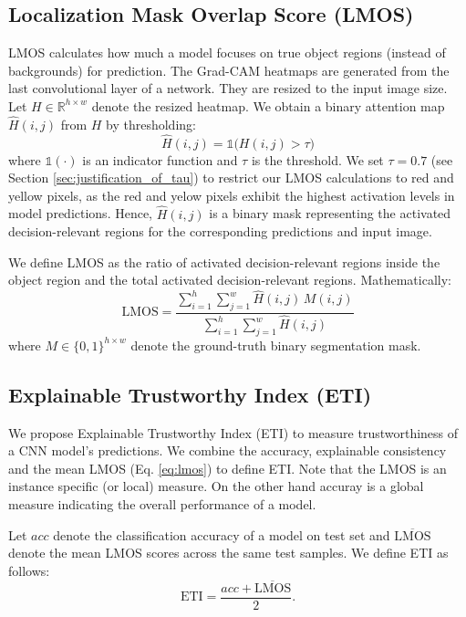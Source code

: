 \documentclass[a4paper,fleqn]{cas-dc}
\begin{document}
	\subsection{Localization Mask Overlap Score (LMOS)} 
	\label{sec:lmos}
	LMOS calculates how much a model focuses on true object regions (instead of backgrounds) for prediction. The Grad-CAM heatmaps are generated from
    the last convolutional layer of a network. They are resized to the input image size. 
	Let $H \in \mathbb{R}^{h \times w}$ denote the resized heatmap. 
	We obtain a binary attention map $\hat H (i,j)$ from $H$ by thresholding:
	\begin{equation}
		\label{eq:binary_attention_map}
		\hat H (i,j) = \mathds{1}\bigl( H(i,j) > \tau \bigr)
	\end{equation}
	where $ \mathds{1}(\cdot)$ is an indicator function and $\tau$ is the threshold. 
	We set $\tau=0.7$ (see Section \ref{sec:justification_of_tau}) to restrict our LMOS calculations to red and yellow pixels, as the red and yelow pixels exhibit the highest activation levels in model predictions. 
	Hence, $\hat{H}(i,j)$ is a binary mask representing the activated decision-relevant regions for the corresponding predictions and input image. 
	
	We define LMOS as the ratio of activated decision-relevant regions inside the object region and the total activated decision-relevant regions. 
	Mathematically:
	\begin{equation}
		\label{eq:lmos}
		\mathrm{LMOS}  = \frac{\sum_{i=1}^{h}\sum_{j=1}^{w} \hat{H}(i,j)\, M(i,j)} {\sum_{i=1}^{h}\sum_{j=1}^{w} \hat{H}(i,j)}
	\end{equation}
	where $M \in \{0,1\}^{h \times w}$ denote the ground-truth binary segmentation mask.  
	
	\subsection{Explainable Trustworthy Index (ETI)}
	\label{sec:implementaiton_TI}
	We propose Explainable Trustworthy Index (ETI) to measure trustworthiness of a CNN model's predictions. 
	We combine the accuracy, explainable consistency and the mean LMOS (Eq. \ref{eq:lmos}) to define ETI. 
	Note that the LMOS is an instance specific (or local) measure. 
	On the other hand accuray is a global measure indicating the overall performance of a model. 
	
	Let $acc$ denote the classification accuracy of a model on test set and $\overline{\mathrm{LMOS}}$ denote the mean LMOS scores across the same test samples. 
	We define ETI as follows:
	\begin{equation}
		\label{eq:eti}
		\mathrm{ETI} = \frac{acc + \overline{\mathrm{LMOS}}}{2}.
	\end{equation}
	
\end{document}
